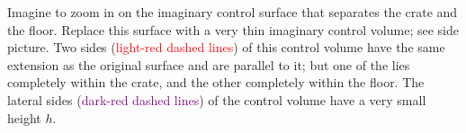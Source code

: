 \documentclass[a4paper,12pt,%
onecolumn,oneside,%
british%
]{memoir}
\renewcommand*{\|}[1][]{\nonscript\:#1\vert\nonscript\:\mathopen{}}
\begin{document}
Imagine to zoom in on the imaginary control surface that separates the crate and the floor. Replace this surface with a very thin imaginary control volume; see side picture. Two sides (\textcolor{red}{light-red dashed lines}) of this control volume have the same extension as the original surface and are parallel to it; but one of the lies completely within the crate, and the other completely within the floor. The lateral sides (\textcolor{purple}{dark-red dashed lines}) of the control volume have a very small height $h$.
%
%
\end{document}
